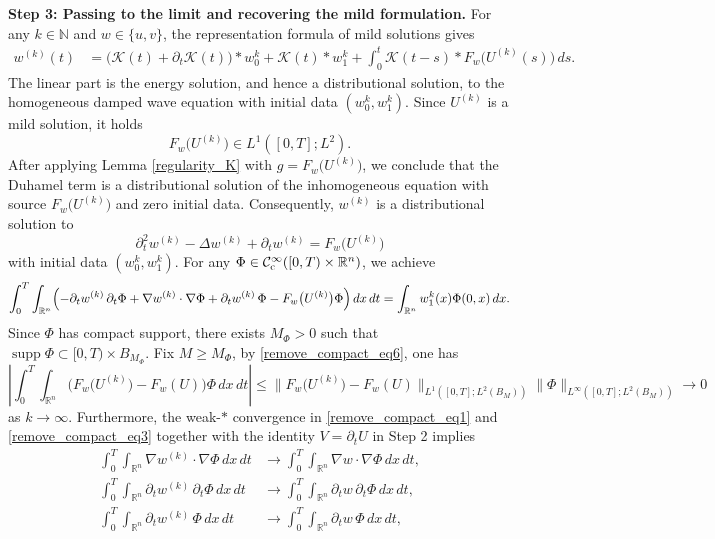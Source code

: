 \documentclass[11pt,reqno]{amsart}
\newcommand{\ity}{\infty}
\begin{document}
	\medskip
	\noindent
	\textbf{Step 3: Passing to the limit and recovering the mild formulation.}
	For any $k\in\mathbb N$ and $w\in\{u,v\}$, the representation formula of mild solutions gives
	\[
	\begin{aligned}
		w^{(k)}(t)
		&=\bigl(\mathcal K(t)+\partial_t\mathcal K(t)\bigr)*w_0^k
		+\mathcal K(t)*w_1^k
		+\int_0^t\mathcal K(t-s)*F_w\big(U^{(k)}(s)\big)\,ds.
	\end{aligned}
	\]
	The linear part is the energy solution, and hence a distributional
	solution, to the homogeneous damped wave equation with initial data
	$(w_0^k,w_1^k)$. Since $U^{(k)}$ is a mild solution, it holds
	\[
	F_w\big(U^{(k)}\big)\in L^1([0,T];L^2).
	\]
	After applying Lemma \ref{regularity_K} with $g=F_w\big(U^{(k)}\big)$, we conclude that the Duhamel term is a distributional solution of the inhomogeneous equation with source $F_w\big(U^{(k)}\big)$ and zero initial data. Consequently, $w^{(k)}$ is a distributional solution to
	\[
	\partial_t^2w^{(k)}-\Delta w^{(k)}+\partial_tw^{(k)}=F_w\big(U^{(k)}\big)
	\]
	with initial data $(w_0^k,w_1^k)$. For any $\Phi\in \mathcal{C}^\infty_{\rm c}([0,T)\times\mathbb R^n)$, we achieve
	\begin{equation}\label{remove_compact_eq7}
		\begin{aligned}
			\int_0^T\int_{\mathbb R^n}\Bigl(-\partial_tw^{(k)}\,\partial_t\Phi+\nabla w^{(k)}\cdot\nabla\Phi+\partial_tw^{(k)}\,\Phi-F_w\big(U^{(k)}\big)\Phi\Bigr)\,dx\,dt=\int_{\mathbb R^n}w_1^k(x)\Phi(0,x)\,dx.
		\end{aligned}
	\end{equation}
	Since $\Phi$ has compact support, there exists $M_\Phi>0$ such that $\operatorname{supp}\Phi\subset [0,T)\times B_{M_\Phi}$. Fix $M\geq M_\Phi$, by \eqref{remove_compact_eq6}, one has
	\[
	\left|\int_0^T\int_{\mathbb R^n}\bigl(F_w\big(U^{(k)}\big)-F_w(U)\bigr)\Phi\,dx\,dt\right|\leq \|F_w\big(U^{(k)}\big)-F_w(U)\|_{L^1([0,T];L^2(B_M))}\|\Phi\|_{L^\infty([0,T];L^2(B_M))}\to 0
	\]
	as $k\to\ity$. Furthermore, the weak-$*$ convergence in \eqref{remove_compact_eq1} and \eqref{remove_compact_eq3} together with the identity $V=\partial_tU$ in Step 2 implies
	\begin{align*}
		\int_0^T\int_{\mathbb R^n}\nabla w^{(k)} \cdot\nabla\Phi\,dx\,dt &\to \int_0^T\int_{\mathbb R^n}\nabla w\cdot\nabla\Phi\,dx\,dt, \\
		\int_0^T\int_{\mathbb R^n}\partial_tw^{(k)}\,\partial_t\Phi\,dx\,dt &\to \int_0^T\int_{\mathbb R^n}\partial_tw\,\partial_t\Phi\,dx\,dt, \\
		\int_0^T\int_{\mathbb R^n}\partial_tw^{(k)}\,\Phi\,dx\,dt &\to \int_0^T\int_{\mathbb R^n} \partial_tw\,\Phi\,dx\,dt,
	\end{align*}
\end{document}
